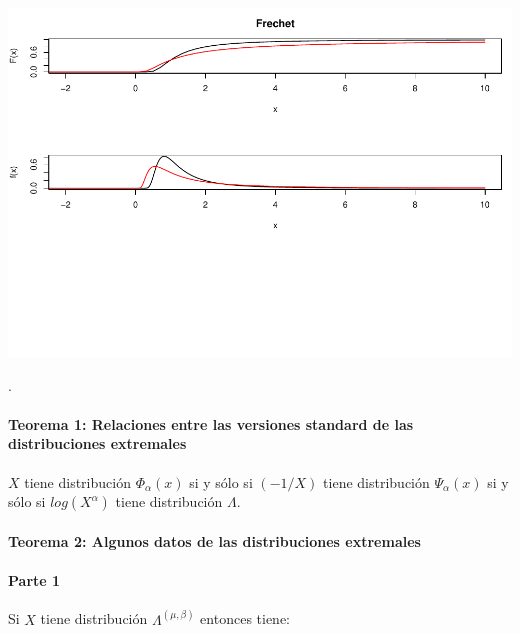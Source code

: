 \documentclass[
  oneside]{book}
\begin{document}
\includegraphics{extremales_files/figure-latex/unnamed-chunk-11-1.pdf}

.

\newpage

\hypertarget{teorema-1-relaciones-entre-las-versiones-standard-de-las-distribuciones-extremales}{%
\paragraph{Teorema 1: Relaciones entre las versiones standard de las
distribuciones
extremales}\label{teorema-1-relaciones-entre-las-versiones-standard-de-las-distribuciones-extremales}}

\(X\) tiene distribución \(\Phi_{\alpha}(x)\) si y sólo si \((-1/X)\)
tiene distribución \(\Psi_{\alpha}(x)\) si y sólo si \(log(X^{\alpha})\)
tiene distribución \(\Lambda\).

\hypertarget{teorema-2-algunos-datos-de-las-distribuciones-extremales}{%
\paragraph{Teorema 2: Algunos datos de las distribuciones
extremales}\label{teorema-2-algunos-datos-de-las-distribuciones-extremales}}

\hypertarget{parte-1}{%
\paragraph{Parte 1}\label{parte-1}}

Si \(X\) tiene distribución \(\Lambda^{(\mu,\beta)}\) entonces tiene:
\end{document}
